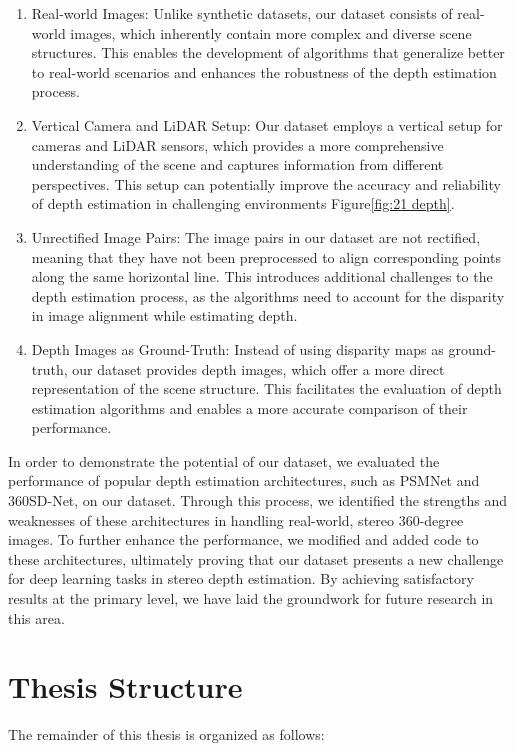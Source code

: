 \documentclass[english, LaM, oneside]{sapthesis}%
\begin{document}
\begin{enumerate}
    \item Real-world Images: Unlike synthetic datasets, our dataset consists of real-world images, which inherently contain more complex and diverse scene structures. This enables the development of algorithms that generalize better to real-world scenarios and enhances the robustness of the depth estimation process.
    \item Vertical Camera and LiDAR Setup: Our dataset employs a vertical setup for cameras and LiDAR sensors, which provides a more comprehensive understanding of the scene and captures information from different perspectives. This setup can potentially improve the accuracy and reliability of depth estimation in challenging environments Figure\ref{fig:21 depth}.
    \item Unrectified Image Pairs: The image pairs in our dataset are not rectified, meaning that they have not been preprocessed to align corresponding points along the same horizontal line. This introduces additional challenges to the depth estimation process, as the algorithms need to account for the disparity in image alignment while estimating depth.
    \item Depth Images as Ground-Truth: Instead of using disparity maps as ground-truth, our dataset provides depth images, which offer a more direct representation of the scene structure. This facilitates the evaluation of depth estimation algorithms and enables a more accurate comparison of their performance.
\end{enumerate}

In order to demonstrate the potential of our dataset, we evaluated the performance of popular depth estimation architectures, such as PSMNet and 360SD-Net, on our dataset. Through this process, we identified the strengths and weaknesses of these architectures in handling real-world, stereo 360-degree images. To further enhance the performance, we modified and added code to these architectures, ultimately proving that our dataset presents a new challenge for deep learning tasks in stereo depth estimation. By achieving satisfactory results at the primary level, we have laid the groundwork for future research in this area.



\section{Thesis Structure}
The remainder of this thesis is organized as follows:
\end{document}

